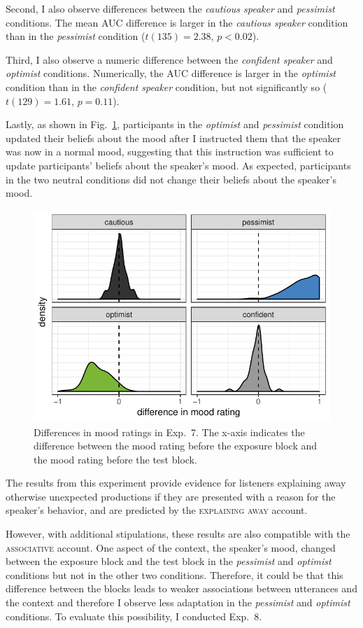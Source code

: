 Second, I also observe differences between the \textit{cautious speaker} and \textit{pessimist} conditions. The mean AUC difference is larger in the \textit{cautious speaker} condition than in the \textit{pessimist} condition  ($t(135)=2.38$, $p < 0.02$).

Third, I also observe a numeric difference between the \textit{confident speaker} and \textit{optimist} conditions. Numerically, the AUC difference is larger in the \textit{optimist} condition than in the \textit{confident speaker} condition, but not significantly so ($t(129) =1.61$, $p = 0.11$).

Lastly, as shown in Fig.~\ref{fig:manip-check-exp7}, participants in the \textit{optimist} and \textit{pessimist} condition updated their beliefs about the mood after I instructed them that the speaker was now in a normal mood, suggesting that this instruction was sufficient to update participants' beliefs about the speaker's mood. As expected, participants in the two neutral conditions did not change their beliefs about the speaker's mood. 

\begin{figure}[t]
    \centering
    \includegraphics[width=.6\columnwidth, trim={0 0.75cm 0 0cm}]{./plots/mood-differences-exp2.pdf}
    \caption{Differences in mood ratings in Exp.~7. The x-axis indicates the difference between the mood rating before the exposure block and the mood rating before the test block.}
    \label{fig:manip-check-exp7}
\end{figure}


The results from this experiment provide evidence for listeners explaining away otherwise unexpected productions if they are presented with a reason for the speaker's behavior, and are predicted by the \textsc{explaining away} account. 

However, with additional stipulations, these results are also compatible with the \textsc{associative} account. One aspect of the context, the speaker's mood, changed between the exposure block and the test block in the \textit{pessimist} and \textit{optimist} conditions but not in the other two conditions. Therefore, it could be that this difference between the blocks leads to weaker associations between utterances and the context and therefore I observe less adaptation in the \textit{pessimist} and \textit{optimist} conditions. To evaluate this possibility, I conducted Exp.~8.


